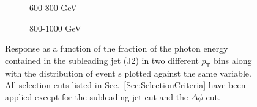 \begin{figure}[!ht]
  \centering
  \begin{subfigure}{.5\textwidth}
    \centering
    \caption{600-800 GeV}
  \end{subfigure}%
  \begin{subfigure}{.5\textwidth}
    \centering
    \caption{800-1000 GeV}
  \end{subfigure}
  \caption[Response as a function of the subleading jet cut, 600-800 and 800-1000 GeV bins]
  {\small Response as a function of the fraction of the photon energy contained in the subleading jet (J2) in two different $p_{\mathrm T}$ bins along with the distribution of event
s plotted against the same variable.  All selection cuts listed in Sec.~\ref{Sec:SelectionCriteria} have been applied except for the subleading jet cut and the $\Delta\phi$ cut.  }
  \label{plot:GJetEMJ2600-800_2016App}
\end{figure}


